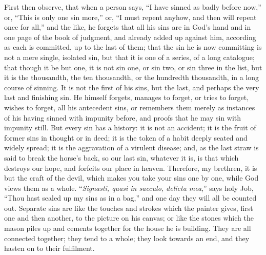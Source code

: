 First then observe, that when a person says, ``I have sinned as
badly before now,'' or, ``This is only one sin more,'' or,
``I must repent anyhow, and then will repent once for all,''
and the like, he forgets that all his sins are in God's hand and in
one page of the book of judgment, and already added up against him,
according as each is committed, up to the last of them; that the sin
he is now committing is not a mere single, isolated sin, but that it
is one of a series, of a long catalogue; that though it be but one, it
is not sin one, or sin two, or sin three in the list, but it is the
thousandth, the ten thousandth, or the hundredth thousandth, in a long
course of sinning. It is not the first of his sins, but the last, and
perhaps the very last and finishing sin. He himself forgets, manages
to forget, or tries to forget, wishes to forget, all his antecedent
sins, or remembers them merely as instances of his having sinned with
impunity before, and proofs that he may sin with impunity still. But
every sin has a history: it is not an accident; it is the fruit of
former sins in thought or in deed; it is the token of a habit deeply
seated and widely spread; it is the aggravation of a virulent disease;
and, as the last straw is said to break the horse's back, so our last
sin, whatever it is, is that which destroys our hope, and forfeits our
place in heaven. Therefore, my brethren, it is but the craft of the
devil, which makes you take your sins one by one, while God views them
as a whole. ``\emph{Signasti, quasi in sacculo, delicta mea},''
says holy Job, ``Thou hast sealed up my sins as in a bag,''
and one day they will all be counted out. Separate sins are like the
touches and strokes which the painter gives, first one and then
another, to the picture on his canvas; or like the stones which the
mason piles up and cements together for the house he is building. They
are all connected together; they tend to a whole; they look towards an
end, and they hasten on to their fulfilment.

